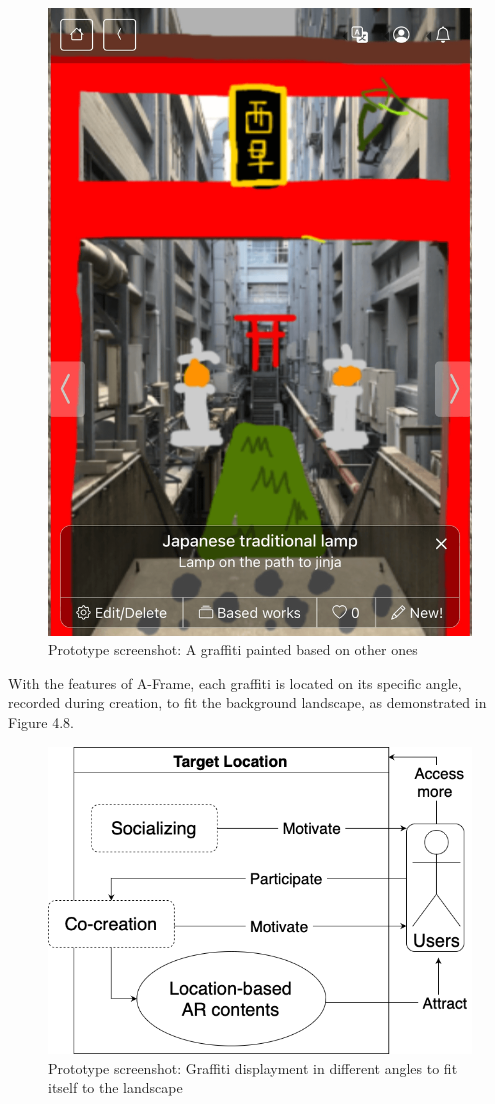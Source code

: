 \begin{figure}
\begin{minipage}{0.48\textwidth}
    \includegraphics[width=0.9\linewidth]{resources/4_methodology/prototype_based_graffiti.png}
      \caption{Prototype screenshot: A graffiti painted based on other ones}
  \end{minipage}
\end{figure}

With the features of A-Frame, each graffiti is located on its specific angle, recorded during creation, to fit the background landscape, as demonstrated in Figure 4.8.

\begin{figure}
  \centering
  \includegraphics[width=0.8\columnwidth]{resources/4_methodology/proposed_framework_revitalization_with_AR_and_cocreation.png}
    \caption{Prototype screenshot: Graffiti displayment in different angles to fit itself to the landscape}
\end{figure}

